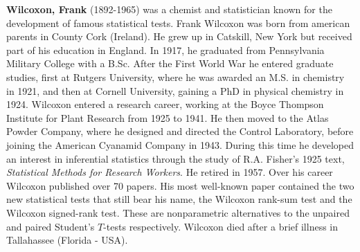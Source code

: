 \textbf{Wilcoxon, Frank} (1892-1965) was a chemist and statistician known for the development of famous statistical tests. Frank Wilcoxon was born from american parents in County Cork (Ireland). He grew up in Catskill, New York but received part of his education in England. In 1917, he graduated from Pennsylvania Military College with a B.Sc. After the First World War he entered graduate studies, first at Rutgers University, where he was awarded an M.S. in chemistry in 1921, and then at Cornell University, gaining a PhD in physical chemistry in 1924. Wilcoxon entered a research career, working at the Boyce Thompson Institute for Plant Research from 1925 to 1941. He then moved to the Atlas Powder Company, where he designed and directed the Control Laboratory, before joining the American Cyanamid Company in 1943. During this time he developed an interest in inferential statistics through the study of R.A. Fisher's 1925 text, \textit{Statistical Methods for Research Workers}. He retired in 1957. Over his career Wilcoxon published over 70 papers. His most well-known paper contained the two new statistical tests that still bear his name, the Wilcoxon rank-sum test and the Wilcoxon signed-rank test. These are nonparametric alternatives to the unpaired and paired Student's $T$-tests respectively. Wilcoxon died after a brief illness in Tallahassee (Florida - USA).

